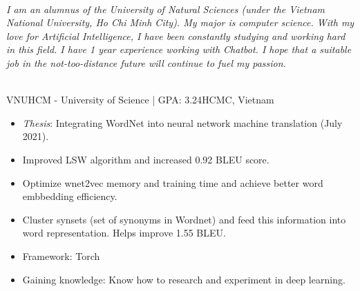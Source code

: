 \documentclass[letter]{cv-template}
\begin{document}
    \displayheader \vspace{1.2cm}

   

    \\
        \textit{I am an alumnus of the University of Natural Sciences (under the Vietnam National University, Ho Chi Minh City). My major is computer science. With my love for Artificial Intelligence, I have been constantly studying and working hard in this field. I have 1 year experience working with Chatbot. I hope that a suitable job in the not-too-distance future will continue to fuel my passion.}\\\\


        {VNUHCM - University of Science | GPA: 3.24}{HCMC, Vietnam}{
            \begin{itemize}
                \item \textit{Thesis}: Integrating WordNet into neural network machine translation  (July 2021). 
            \end{itemize} \leavevmode
        }




        {}{
            \begin{itemize}
                \item Improved LSW algorithm and increased 0.92 BLEU score.
                \item Optimize wnet2vec memory and training time and achieve better word embbedding efficiency.
                \item Cluster synsets (set of synonyms in Wordnet) and feed this information into word representation. Helps improve 1.55 BLEU.
                \item Framework: Torch
                \item Gaining knowledge: Know how to research and experiment in deep learning.
            \end{itemize} \leavevmode
        }
\end{document}
